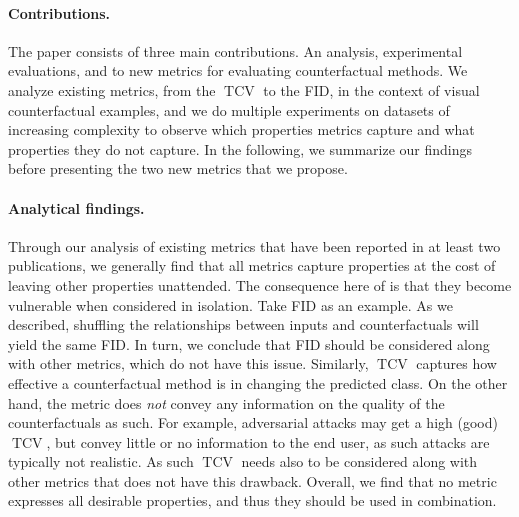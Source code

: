 \documentclass[11pt,a4paper,twoside,openright,final]{memoir}
\newcommand*{\paperref}[1]{Paper \hyperref[#1]{\ref{#1}}}
\begin{document}
\paragraph{Contributions.}
The paper consists of three main contributions.
An analysis, experimental evaluations, and to new metrics for evaluating counterfactual methods.
We analyze existing metrics, from the $\operatorname{TCV}$ to the FID, in the context of visual counterfactual examples, and we do multiple experiments on datasets of increasing complexity to observe which properties metrics capture and what properties they do not capture.
In the following, we summarize our findings before presenting the two new metrics that we propose.

\paragraph{Analytical findings.}
Through our analysis of existing metrics that have been reported in at least two publications, we generally find that all metrics capture properties at the cost of leaving other properties unattended.
The consequence here of is that they become vulnerable when considered in isolation.
Take FID as an example.
As we described, shuffling the relationships between inputs and counterfactuals will yield the same FID.
In turn, we conclude that FID should be considered along with other metrics, which do not have this issue.
Similarly, $\operatorname{TCV}$ captures how effective a counterfactual method is in changing the predicted class. 
On the other hand, the metric does \emph{not} convey any information on the quality of the counterfactuals as such.
For example, adversarial attacks may get a high (good) $\operatorname{TCV}$, but convey little or no information to the end user, as such attacks are typically not realistic.
As such $\operatorname{TCV}$ needs also to be considered along with other metrics that does not have this drawback.
Overall, we find that no metric expresses all desirable properties, and thus they should be used in combination.
\end{document}
